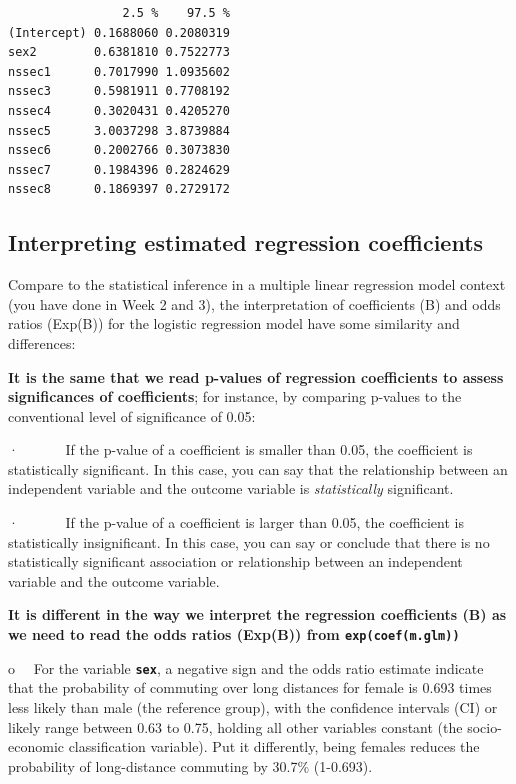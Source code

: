 \documentclass[
  letterpaper,
  DIV=11,
  numbers=noendperiod]{scrreprt}
\begin{document}
\begin{verbatim}
                2.5 %    97.5 %
(Intercept) 0.1688060 0.2080319
sex2        0.6381810 0.7522773
nssec1      0.7017990 1.0935602
nssec3      0.5981911 0.7708192
nssec4      0.3020431 0.4205270
nssec5      3.0037298 3.8739884
nssec6      0.2002766 0.3073830
nssec7      0.1984396 0.2824629
nssec8      0.1869397 0.2729172
\end{verbatim}

\subsection{\texorpdfstring{\textbf{Interpreting estimated regression
coefficients}}{Interpreting estimated regression coefficients}}\label{interpreting-estimated-regression-coefficients}

Compare to the statistical inference in a multiple linear regression
model context (you have done in Week 2 and 3), the interpretation of
coefficients (B) and odds ratios (Exp(B)) for the logistic regression
model have some similarity and differences:

\textbf{It is the same that we read p-values of regression coefficients
to assess significances of coefficients}; for instance, by comparing
p-values to the conventional level of significance of 0.05:

·~~~~~~ If the p-value of a coefficient is smaller than 0.05, the
coefficient is statistically significant. In this case, you can say that
the relationship between an independent variable and the outcome
variable is \emph{statistically} significant.

·~~~~~~ If the p-value of a coefficient is larger than 0.05, the
coefficient is statistically insignificant. In this case, you can say or
conclude that there is no statistically significant association or
relationship between an independent variable and the outcome variable.

\textbf{It is different in the way we interpret the regression
coefficients (B) as we need to read the odds ratios (Exp(B)) from
\texttt{exp(coef(m.glm))}}

o~~ For the variable \textbf{\texttt{sex}}, a negative sign and the odds
ratio estimate indicate that the probability of commuting over long
distances for female is 0.693 times less likely than male (the reference
group), with the confidence intervals (CI) or likely range between 0.63
to 0.75, holding all other variables constant (the socio-economic
classification variable). Put it differently, being females reduces the
probability of long-distance commuting by 30.7\% (1-0.693).
\end{document}
